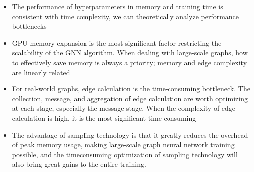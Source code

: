 \begin{itemize}
    \item The performance of hyperparameters in memory and training time is consistent with time complexity, 
    we can theoretically analyze performance bottlenecks
    \item GPU memory expansion is the most significant factor restricting the scalability of the GNN algorithm. 
    When dealing with large-scale graphs, how to effectively save memory is always a priority; memory and edge complexity are linearly related 
    \item For real-world graphs, edge calculation is the time-consuming bottleneck. 
    The collection, message, and aggregation of edge calculation are worth optimizing at each stage, especially the message stage. 
    When the complexity of edge calculation is high, it is the most significant time-consuming 
    \item The advantage of sampling technology is that it greatly reduces the overhead of peak memory usage, 
    making large-scale graph neural network training possible, 
    and the time\-consuming optimization of sampling technology will also bring great gains to the entire training.
\end{itemize}
